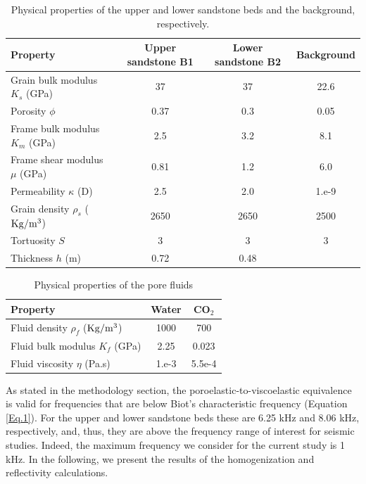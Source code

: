 \documentclass[draft]{agujournal2019}
\begin{document}
\begin{table}[!ht]
  \caption{Physical properties of the upper and lower sandstone beds and the background, respectively. }
\begin{center}
  \begin{tabular}{ | l  c  c c | }
    \hline
    Property & Upper sandstone B1 & Lower
     sandstone B2 & Background  \\ \hline
    Grain bulk modulus $K_s$ (\rm{GPa}) & 37 & 37 & 22.6 \\ 
    Porosity $\phi$ & 0.37 & 0.3 & 0.05  \\ 
    Frame bulk modulus $K_m$ (GPa) & 2.5  & 3.2 & 8.1\\ 
    Frame shear modulus $\mu$ (GPa) & 0.81  & 1.2 & 6.0 \\
    Permeability $\kappa$ (D) & 2.5 & 2.0 & 1.e-9 \\
    Grain density $\rho_s$ ($\rm{Kg/m^3}$) &2650 & 2650 & 2500\\ 
    Tortuosity $S$ & 3 & 3 & 3\\
    Thickness $h$ (m) & 0.72 & 0.48 & \\                                      
    \hline
  \end{tabular}
  \label{table.1}
\end{center}
\end{table}

\begin{table}[!ht]
  \caption{Physical properties of the pore fluids}
\begin{center}
  \begin{tabular}{ | l  c  c |  }
    \hline
    Property & Water & CO$_2$\\ \hline
    Fluid density $\rho_f$ ($\rm{Kg/m^3}$) & 1000 & 700\\
    Fluid bulk modulus $K_f$ (\rm{GPa}) & 2.25 & 0.023\\
    Fluid viscosity $\eta$ (\rm{Pa.s})& 1.e-3 & 5.5e-4\\
    \hline
  \end{tabular}
  \label{table.2}
\end{center}
\end{table}

As stated in the methodology section, the poroelastic-to-viscoelastic equivalence is valid for frequencies that are below Biot's characteristic frequency (Equation \eqref{Eq.1}). For the upper and lower sandstone beds these are 6.25 kHz and 8.06 kHz, respectively, and, thus, they are above the frequency range of interest for seismic studies. Indeed, the maximum frequency we consider for the current study is 1 kHz. In the following, we present the results of the homogenization and reflectivity calculations.
\end{document}
